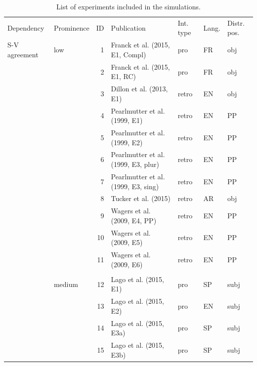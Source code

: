 \documentclass{cambridge7A}\usepackage[]{graphicx}\usepackage[]{color}
\begin{document}
\begin{subappendices}
\begin{table}[ht]
\centering
\caption{List of experiments included in the simulations.}
\label{tab:exps}
{\scriptsize
\begin{tabular}{llrllll}
Dependency     & Prominence & ID & Publication                         & Int. type & Lang. & Distr. pos. \\
S-V agreement  & low      & 1     & Franck et al. (2015, E1, Compl)     & pro     & FR   & obj \\
               &            & 2     & Franck et al. (2015, E1, RC)        & pro     & FR   & obj \\
               &            & 3     & Dillon et al. (2013, E1)            & retro   & EN   & obj \\
               &            & 4     & Pearlmutter et al. (1999, E1)       & retro   & EN   & PP \\
               &            & 5     & Pearlmutter et al. (1999, E2)       & retro   & EN   & PP \\
               &            & 6     & Pearlmutter et al. (1999, E3, plur) & retro   & EN   & PP \\
               &            & 7     & Pearlmutter et al. (1999, E3, sing) & retro   & EN   & PP \\
               &            & 8     & Tucker et al. (2015)                & retro   & AR   & obj \\
               &            & 9     & Wagers et al. (2009, E4, PP)        & retro   & EN   & PP \\
               &            & 10    & Wagers et al. (2009, E5)            & retro   & EN   & PP \\
               &            & 11    & Wagers et al. (2009, E6)            & retro   & EN   & PP \\
&&&&&& \\
               & medium         & 12    & Lago et al. (2015, E1)              & pro     & SP   & subj \\
               &            & 13    & Lago et al. (2015, E2)              & pro     & EN   & subj \\
               &            & 14    & Lago et al. (2015, E3a)             & pro     & SP   & subj \\
               &            & 15    & Lago et al. (2015, E3b)             & pro     & SP   & subj \\

\end{tabular}}
\end{table}
\end{subappendices}
\end{document}
